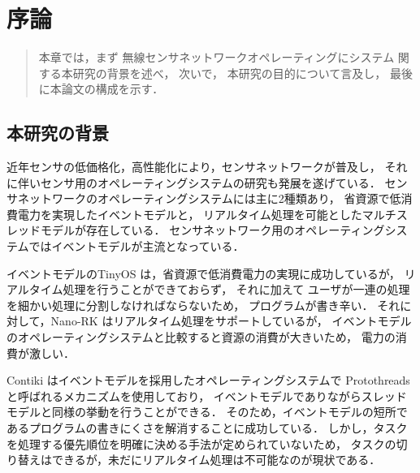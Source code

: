 \chapter{序論}
\begin{large}
\begin{quote}
本章では，まず
無線センサネットワークオペレーティングにシステム
関する本研究の背景を述べ，
次いで，
本研究の目的について言及し，
最後に本論文の構成を示す．
\end{quote}
\end{large}
\clearpage

\section{本研究の背景}
近年センサの低価格化，高性能化により，センサネットワークが普及し，
それに伴いセンサ用のオペレーティングシステムの研究も発展を遂げている．
センサネットワークのオペレーティングシステムには主に2種類あり，
省資源で低消費電力を実現したイベントモデルと，
リアルタイム処理を可能としたマルチスレッドモデルが存在している．
センサネットワーク用のオペレーティングシステムではイベントモデルが主流となっている．

イベントモデルのTinyOS\cite{Hill:2000:SAD:356989.356998}\cite{Levis04tinyos:an}
は，省資源で低消費電力の実現に成功しているが，
リアルタイム処理を行うことができておらず，
それに加えて
ユーザが一連の処理を細かい処理に分割しなければならないため，
プログラムが書き辛い．
それに対して，Nano-RK\cite{Eswaran:2005:NER:1106608.1106672}
はリアルタイム処理をサポートしているが，
イベントモデルのオペレーティングシステムと比較すると資源の消費が大きいため，
電力の消費が激しい．

Contiki\cite{Dunkels:2004:CLF:1032658.1034117}
はイベントモデルを採用したオペレーティングシステムで
Protothreads\cite{Dunkels:2006:PSE:1182807.1182811} 
と呼ばれるメカニズムを使用しており，
イベントモデルでありながらスレッドモデルと同様の挙動を行うことができる．
そのため，イベントモデルの短所であるプログラムの書きにくさを解消することに成功している．
しかし，タスクを処理する優先順位を明確に決める手法が定められていないため，
タスクの切り替えはできるが，未だにリアルタイム処理は不可能なのが現状である．


